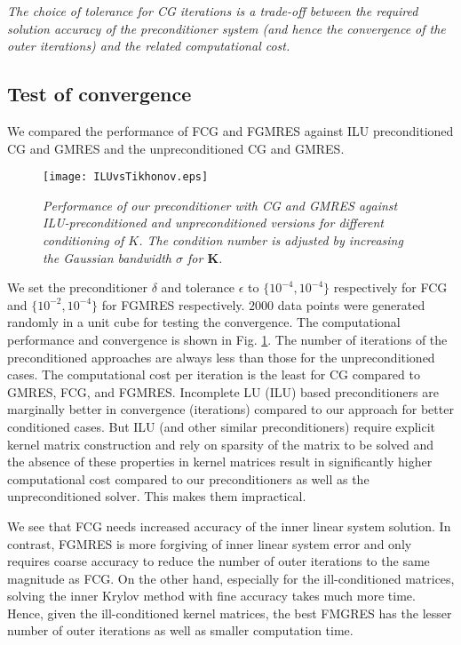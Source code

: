 \documentclass[10pt,journal,letterpaper,compsoc]{IEEEtran}
\begin{document}
\emph{The choice of tolerance for CG iterations is a trade-off between the required solution accuracy of the   preconditioner system (and hence the convergence of the outer iterations) and the related computational cost. }

\subsection{Test of convergence\label{sec:TestOfConvergence}}
We compared the performance of FCG and FGMRES against ILU preconditioned CG and GMRES and the unpreconditioned CG and GMRES.

\begin{figure}[bth]
\centering
\texttt{[image: ILUvsTikhonov.eps]}
\caption{\emph{Performance of our preconditioner with CG and GMRES against ILU-preconditioned and unpreconditioned versions for different conditioning of $K$. The condition number is adjusted by increasing the Gaussian bandwidth $\sigma$ for $\mathbf{K}$.\label{fig:fgmres}}}
\end{figure}

We set the preconditioner $\delta$ and tolerance $\epsilon$ to $\{10^{-4},10^{-4}\}$ respectively for FCG and $\{10^{-2},10^{-4}\}$ for FGMRES respectively. $2000$ data points were generated randomly in a unit cube for testing the convergence. The computational performance and convergence is shown in Fig. \ref{fig:fgmres}. The number of iterations of the preconditioned approaches are always less than those for the unpreconditioned cases. The computational cost per iteration is the least for CG compared to GMRES, FCG, and FGMRES. Incomplete LU (ILU) based preconditioners are marginally better in convergence (iterations) compared to our approach for better conditioned cases. But ILU (and other similar preconditioners) require explicit kernel matrix construction and rely on sparsity of the matrix to be solved and the absence of these properties in kernel matrices result in significantly higher computational cost compared to our preconditioners as well as the unpreconditioned solver. This makes them impractical.

We see that FCG needs increased accuracy of the inner linear system solution. In contrast, FGMRES is more forgiving of inner linear system error and only requires coarse accuracy to reduce the number of outer iterations to the same magnitude as FCG. On the other hand, especially for the ill-conditioned matrices, solving the inner Krylov method with fine accuracy takes much more time. Hence, given the ill-conditioned kernel matrices, the best FMGRES has the lesser number of outer iterations as well as smaller computation time.
\end{document}
